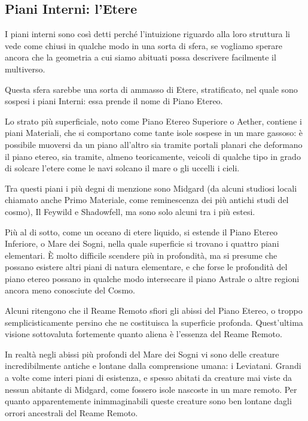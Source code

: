 \subsection{Piani Interni: l’Etere}
I piani interni sono così detti perché l’intuizione riguardo alla loro struttura li vede come chiusi in qualche modo in una sorta di sfera, se vogliamo sperare ancora che la geometria a cui siamo abituati possa descrivere facilmente il multiverso.

Questa sfera sarebbe una sorta di ammasso di Etere, stratificato, nel quale sono sospesi i piani Interni: essa prende il nome di Piano Etereo.

Lo strato più superficiale, noto come Piano Etereo Superiore o Aether, contiene i piani Materiali, che si comportano come tante isole sospese in un mare gassoso: è possibile muoversi da un piano all’altro sia tramite portali planari che deformano il piano etereo, sia tramite, almeno teoricamente, veicoli di qualche tipo in grado di solcare l’etere come le navi solcano il mare o gli uccelli i cieli.

Tra questi piani i più degni di menzione sono Midgard (da alcuni studiosi locali chiamato anche Primo Materiale, come reminescenza dei più antichi studi del cosmo), Il Feywild e Shadowfell, ma sono solo alcuni tra i più estesi.

Più al di sotto, come un oceano di etere liquido, si estende il Piano Etereo Inferiore, o Mare dei Sogni, nella quale superficie si trovano i quattro piani elementari. È molto difficile scendere più in profondità, ma si presume che possano esistere altri piani di natura elementare, e che forse le profondità del piano etereo possano in qualche modo intersecare il piano Astrale o altre regioni ancora meno conosciute del Cosmo.

Alcuni ritengono che il Reame Remoto sfiori gli abissi del Piano Etereo, o troppo semplicisticamente persino che ne costituisca la superficie profonda.
Quest’ultima visione sottovaluta fortemente quanto aliena è l’essenza del Reame Remoto.

In realtà negli abissi più profondi del Mare dei Sogni vi sono delle creature incredibilmente antiche e lontane dalla comprensione umana: i Leviatani. Grandi a volte come interi piani di esistenza, e spesso abitati da creature mai viste da nessun abitante di Midgard, come fossero isole nascoste in un mare remoto. Per quanto apparentemente inimmaginabili queste creature sono ben lontane dagli orrori ancestrali del Reame Remoto.


